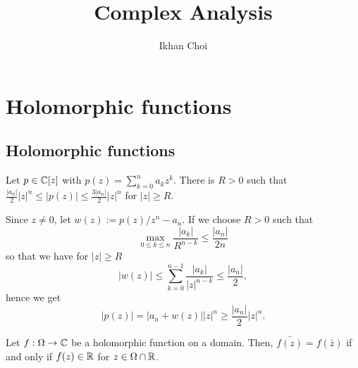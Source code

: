 \documentclass{../note}
\begin{document}
\title{Complex Analysis}
\author{Ikhan Choi}
\maketitle
\tableofcontents



\chapter{Holomorphic functions}

\section{Holomorphic functions}

\begin{prb}
Let $p\in\mathbb{C}[z]$ with $p(z)=\sum_{k=0}^na_kz^k$.
There is $R>0$ such that $\frac{|a_n|}2|z|^n\le|p(z)|\le\frac{3|a_n|}2|z|^n$ for $|z|\ge R$.
\end{prb}
\begin{pf}
Since $z\ne0$, let $w(z):=p(z)/z^n-a_n$.
If we choose $R>0$ such that
\[\max_{0\le k\le n}\frac{|a_k|}{R^{n-k}}\le\frac{|a_n|}{2n}\]
so that we have for $|z|\ge R$
\[|w(z)|\le\sum_{k=0}^{n-1}\frac{|a_k|}{|z|^{n-k}}\le\frac{|a_n|}2,\]
hence we get
\[|p(z)|=|a_n+w(z)||z|^n\ge\frac{|a_n|}2|z|^n.\]
\end{pf}

\begin{prb}
Let $f:\Omega\to\mathbb{C}$ be a holomorphic function on a domain.
Then, $\bar{f(z)}=f(\bar z)$ if and only if $f(z)\in\mathbb{R}$ for $z\in\Omega\cap\mathbb{R}$.
\end{prb}
\end{document}

